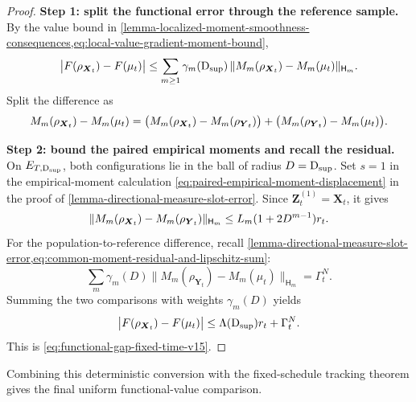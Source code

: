 \begin{proof}
\noindent\textbf{Step 1: split the functional error through the reference sample.}
By the value bound in
\cref{lemma-localized-moment-smoothness-consequences,eq:local-value-gradient-moment-bound},
\[
\bigl|F(\rho_{\boldsymbol{X}_t})-F(\mu_t)\bigr|
\le
\sum_{m\ge1}\gamma_m(\mathrm{D}_{\sup})\,
\|M_m(\rho_{\boldsymbol{X}_t})-M_m(\mu_t)\|_{\mathsf H_m}.
\]
Split the difference as
\[
M_m(\rho_{\boldsymbol{X}_t})-M_m(\mu_t)
=
\bigl(M_m(\rho_{\boldsymbol{X}_t})-M_m(\rho_{\boldsymbol{Y}_t})\bigr)
+
\bigl(M_m(\rho_{\boldsymbol{Y}_t})-M_m(\mu_t)\bigr).
\]

\par\noindent\textbf{Step 2: bound the paired empirical moments and recall the residual.}
On $E_{T,\mathrm{D}_{\sup}}$, both configurations lie in the ball of radius
$D=\mathrm{D}_{\sup}$. Set $s=1$ in the empirical-moment calculation
\cref{eq:paired-empirical-moment-displacement} in the proof of
\cref{lemma-directional-measure-slot-error}. Since
$\mathbf Z_t^{(1)}=\mathbf X_t$, it gives
\[
 \|M_m(\rho_{\boldsymbol{X}_t})-M_m(\rho_{\boldsymbol{Y}_t})\|_{\mathsf H_m}
 \le L_m(1+2D^{m-1})r_t.
\]
For the population-to-reference difference, recall
\cref{lemma-directional-measure-slot-error,eq:common-moment-residual-and-lipschitz-sum}:
\[
 \sum_m\gamma_m(D)\|M_m(\rho_{\mathbf Y_t})-M_m(\mu_t)\|_{\mathsf H_m}
 =\Gamma_t^N.
\]
Summing the two comparisons with weights $\gamma_m(D)$ yields
\[
\bigl|F(\rho_{\boldsymbol{X}_t})-F(\mu_t)\bigr|
\le
\Lambda(\mathrm{D}_{\sup})r_t+\Gamma_t^N.
\]
This is \eqref{eq:functional-gap-fixed-time-v15}.
\end{proof}

Combining this deterministic conversion with the fixed-schedule tracking theorem
gives the final uniform functional-value comparison.

